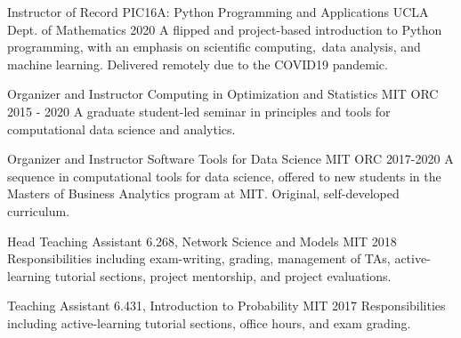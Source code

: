 
\begin{cventries}


  \cventry
    {Instructor of Record}
    {PIC16A: Python Programming and Applications}
    {UCLA Dept. of Mathematics}
    {2020}
    {A flipped and project-based introduction to Python programming, with an emphasis on scientific computing, data analysis, and machine learning. Delivered remotely due to the COVID19 pandemic.}

  \cventry
    {Organizer and Instructor} %
    {Computing in Optimization and Statistics} %
    {MIT ORC} %
    {2015 - 2020} %
    {A graduate student-led seminar in principles and tools for computational data science and analytics.} %

  \cventry
    {Organizer and Instructor} %
    {Software Tools for Data Science} %
    {MIT ORC} %
    {2017-2020} %
    {A sequence in computational tools for data science, offered to new students in the Masters of Business Analytics program at MIT. Original, self-developed curriculum.}  
  
  \cventry
    {Head Teaching Assistant} %
    {6.268, Network Science and Models} %
    {MIT} %
    {2018} %
    {Responsibilities including exam-writing, grading, management of TAs, active-learning tutorial sections, project mentorship, and project evaluations.}  

\cventry
    {Teaching Assistant} %
    {6.431, Introduction to Probability} %
    {MIT} %
    {2017} %
    {Responsibilities including active-learning tutorial sections, office hours, and exam grading.}  
    

\end{cventries}
